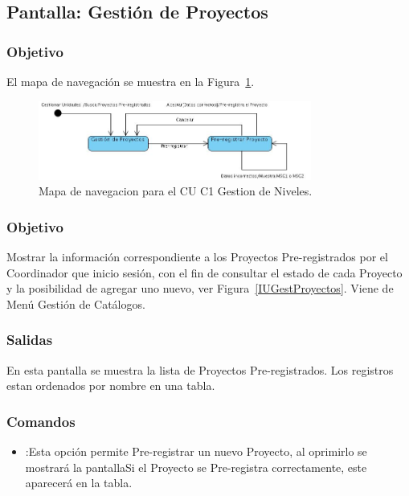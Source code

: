 \subsection{Pantalla: Gestión de Proyectos}
\subsubsection{Objetivo}
	El mapa de navegación se muestra en la Figura~\ref{fig:mapaNavegacionCUC1}.

   \begin{figure}[hbpt!]
 		\centering
 			\includegraphics[width=0.8\textwidth]{images/CUC1/mapaNavegacion.jpg}
 		\caption{Mapa de navegacion para el CU C1 Gestion de Niveles.}
		\label{fig:mapaNavegacionCUC1}
 	\end{figure}

\subsubsection{Objetivo}
Mostrar la información correspondiente a los Proyectos Pre-registrados por el Coordinador que inicio sesión, con el fin de consultar el estado de cada Proyecto y la posibilidad de agregar uno nuevo, ver Figura~\ref{IUGestProyectos}. Viene de Menú Gestión de Catálogos.


\subsubsection{Salidas}
En esta pantalla se muestra la lista de Proyectos Pre-registrados. Los registros estan ordenados por nombre en una tabla.

\subsubsection{Comandos}
\begin{itemize}
 \item {}:Esta opción permite Pre-registrar un nuevo Proyecto, al oprimirlo se mostrará la pantallaSi el Proyecto se Pre-registra correctamente, este aparecerá en la tabla.
\end{itemize}